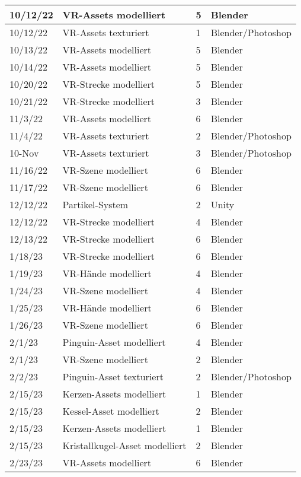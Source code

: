 \begin{longtable}{|p{1.5cm}|p{5.5cm}|p{1.2cm}|p{3.2cm}|}
	10/12/22 & VR-Assets modelliert & 5 & Blender \\ \hline
	10/12/22 & VR-Assets texturiert & 1 & Blender/Photoshop \\ \hline
	10/13/22 & VR-Assets modelliert & 5 & Blender \\ \hline
	10/14/22 & VR-Assets modelliert & 5 & Blender \\ \hline
	10/20/22 & VR-Strecke modelliert & 5 & Blender \\ \hline
	10/21/22 & VR-Strecke modelliert & 3 & Blender \\ \hline
	11/3/22 & VR-Assets modelliert & 6 & Blender \\ \hline
	11/4/22 & VR-Assets texturiert & 2 & Blender/Photoshop \\ \hline
	10-Nov & VR-Assets texturiert & 3 & Blender/Photoshop \\ \hline
	11/16/22 & VR-Szene modelliert & 6 & Blender  \\ \hline
	11/17/22 & VR-Szene modelliert & 6 & Blender  \\ \hline
	12/12/22 & Partikel-System & 2 & Unity \\ \hline
	12/12/22 & VR-Strecke modelliert & 4 & Blender \\ \hline
	12/13/22 & VR-Strecke modelliert & 6 & Blender \\ \hline
	1/18/23 & VR-Strecke modelliert & 6 & Blender \\ \hline
	1/19/23 & VR-Hände modelliert & 4 & Blender \\ \hline
	1/24/23 & VR-Szene modelliert & 4 & Blender \\ \hline
	1/25/23 & VR-Hände modelliert & 6 & Blender \\ \hline
	1/26/23 & VR-Szene modelliert & 6 & Blender \\ \hline
	2/1/23 & Pinguin-Asset modelliert & 4 & Blender \\ \hline
	2/1/23 & VR-Szene modelliert & 2 & Blender \\ \hline
	2/2/23 & Pinguin-Asset texturiert & 2 & Blender/Photoshop \\ \hline
	2/15/23 & Kerzen-Assets modelliert & 1 & Blender \\ \hline
	2/15/23 & Kessel-Asset modelliert & 2 & Blender \\ \hline
	2/15/23 & Kerzen-Assets modelliert & 1 & Blender \\ \hline
	2/15/23 & Kristallkugel-Asset modelliert & 2 & Blender \\ \hline
	2/23/23 & VR-Assets modelliert & 6 & Blender \\ \hline

\end{longtable}
